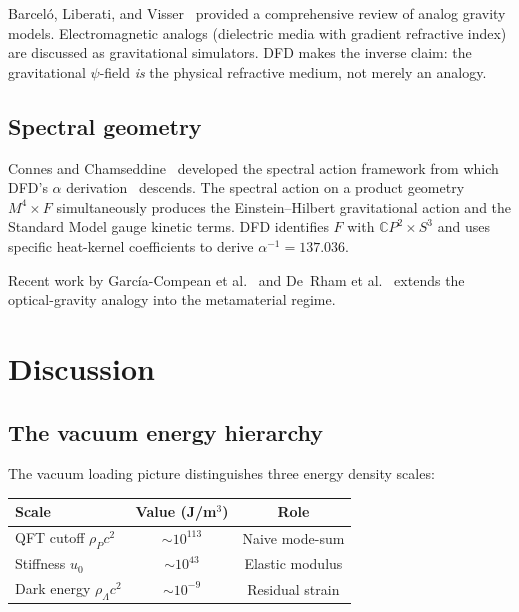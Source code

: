 \documentclass[aps,prd,twocolumn,superscriptaddress,nofootinbib]{revtex4-2}
\newcommand{\CP}{\mathbb{C}P}
\begin{document}
Barcel\'{o}, Liberati, and Visser~\cite{Barcelo2011} provided a
comprehensive review of analog gravity models.  Electromagnetic
analogs (dielectric media with gradient refractive index) are
discussed as gravitational simulators.  DFD makes the inverse claim:
the gravitational $\psi$-field \emph{is} the physical refractive
medium, not merely an analogy.

\subsection{Spectral geometry}

Connes and Chamseddine~\cite{Connes1997,Chamseddine2008} developed the
spectral action framework from which DFD's $\alpha$
derivation~\cite{Alcock2025AbInitio} descends.  The spectral action on
a product geometry $M^4 \times F$ simultaneously produces the
Einstein--Hilbert gravitational action and the Standard Model gauge
kinetic terms.  DFD identifies $F$ with $\CP^2 \times S^3$ and uses
specific heat-kernel coefficients to derive $\alpha^{-1} = 137.036$.

Recent work by Garc\'{i}a-Compean et al.~\cite{Garcia2024} and
De~Rham et al.~\cite{DeRham2025} extends the optical-gravity analogy
into the metamaterial regime.


\section{Discussion}
\label{sec:discussion}

\subsection{The vacuum energy hierarchy}

The vacuum loading picture distinguishes three energy density scales:
\begin{center}
\begin{tabular}{lcc}
\toprule
\textbf{Scale} & \textbf{Value (J/m$^3$)} & \textbf{Role} \\
\midrule
QFT cutoff $\rho_P c^2$ & $\sim 10^{113}$ & Naive mode-sum \\
Stiffness $u_0$ & $\sim 10^{43}$ & Elastic modulus \\
Dark energy $\rho_\Lambda c^2$ & $\sim 10^{-9}$ & Residual strain \\
\bottomrule
\end{tabular}
\end{center}
\end{document}
